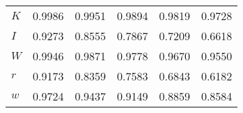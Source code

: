 \begin{center}
\begin{longtable}{lccccc}
$K         $	 & 	    0.9986	 & 	    0.9951	 & 	    0.9894	 & 	    0.9819	 & 	    0.9728 \\ 
$I         $	 & 	    0.9273	 & 	    0.8555	 & 	    0.7867	 & 	    0.7209	 & 	    0.6618 \\ 
$W         $	 & 	    0.9946	 & 	    0.9871	 & 	    0.9778	 & 	    0.9670	 & 	    0.9550 \\ 
$r         $	 & 	    0.9173	 & 	    0.8359	 & 	    0.7583	 & 	    0.6843	 & 	    0.6182 \\ 
$w         $	 & 	    0.9724	 & 	    0.9437	 & 	    0.9149	 & 	    0.8859	 & 	    0.8584 \\ 
\end{longtable}
 \end{center}
